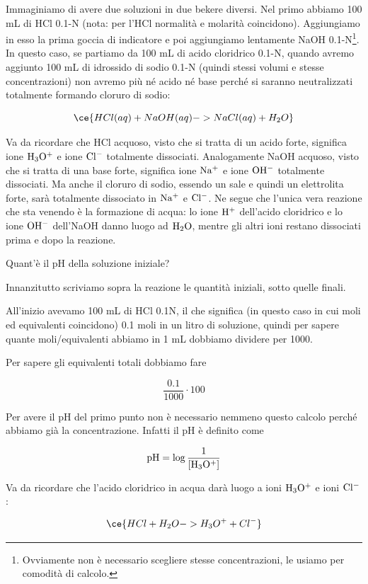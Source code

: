 \vspace{0.2cm}Immaginiamo di avere due soluzioni in due bekere diversi. Nel primo abbiamo 100 mL di HCl 0.1-N (nota: per l'HCl normalità e molarità coincidono). Aggiungiamo in esso la prima goccia di indicatore e poi aggiungiamo lentamente NaOH 0.1-N\footnote{Ovviamente non è necessario scegliere stesse concentrazioni, le usiamo per comodità di calcolo.}. In questo caso, se partiamo da 100 mL di acido cloridrico 0.1-N, quando avremo aggiunto 100 mL di idrossido di sodio 0.1-N (quindi stessi volumi e stesse concentrazioni) non avremo più né acido né base perché si saranno neutralizzati totalmente formando cloruro di sodio:

$$\ce{HCl(aq) + NaOH(aq) -> NaCl(aq) + H_2O}$$

Va da ricordare che HCl acquoso, visto che si tratta di un acido forte, significa ione $\rm H_3O^+$ e ione $\rm Cl^-$ totalmente dissociati. Analogamente NaOH acquoso, visto che si tratta di una base forte, significa ione $\rm Na^+$ e ione $\rm OH^-$ totalmente dissociati. Ma anche il cloruro di sodio, essendo un sale e quindi un elettrolita forte, sarà totalmente dissociato in $\rm Na^+$ e $\rm Cl^-$. Ne segue che l'unica vera reazione che sta venendo è la formazione di acqua: lo ione $\rm H^+$ dell'acido cloridrico e lo ione $\rm OH^-$ dell'NaOH danno luogo ad $\rm H_2O$, mentre gli altri ioni restano dissociati prima e dopo la reazione.

Quant'è il pH della soluzione iniziale?

Innanzitutto scriviamo sopra la reazione le quantità iniziali, sotto quelle finali.

All'inizio avevamo 100 mL di HCl 0.1N, il che significa (in questo caso in cui moli ed equivalenti coincidono) 0.1 moli in un litro di soluzione, quindi per sapere quante moli/equivalenti abbiamo in 1 mL dobbiamo dividere per 1000.

Per sapere gli equivalenti totali dobbiamo fare

$$\frac{0.1}{1000} \cdot 100$$

Per avere il pH del primo punto non è necessario nemmeno questo calcolo perché abbiamo già la concentrazione. Infatti il pH è definito come

$$\rm pH=\log \frac{1}{[H_3O^+]}$$

Va da ricordare che l'acido cloridrico in acqua darà luogo a ioni $\rm H_3O^+$ e ioni $\rm Cl^-$:

$$\ce{HCl + H_2O -> H_3O^+ + Cl^-}$$

